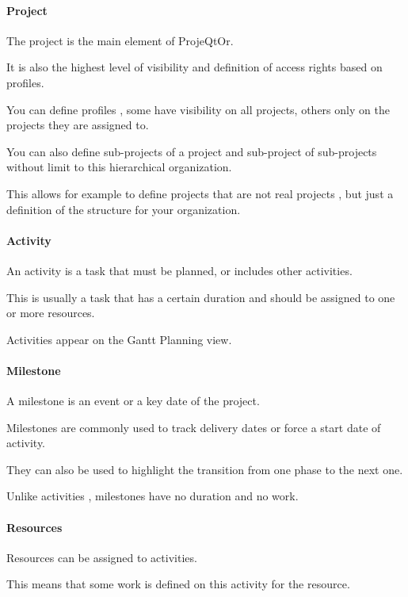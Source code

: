 \documentclass[letterpaper,10pt,english]{sphinxmanual}
\begin{document}
\paragraph{Project}

The project is the main element of ProjeQtOr.

It is also the highest level of visibility and definition of access rights based on profiles.

You can define profiles , some have visibility on all projects, others only on the projects they are assigned to.

You can also define sub-projects of a project and sub-project of sub-projects without limit to this hierarchical organization.

This allows for example to define projects that are not real projects , but just a definition of the structure for your organization.

\paragraph{Activity}

An activity is a task that must be planned, or includes other activities.

This is usually a task that has a certain duration and should be assigned to one or more resources.

Activities appear on the Gantt Planning view.

\paragraph{Milestone}

A milestone is an event or a key date of the project.

Milestones are commonly used to track delivery dates or force a start date of activity.

They can also be used to highlight the transition from one phase to the next one.

Unlike activities , milestones have no duration and no work.

\paragraph{Resources}

Resources can be assigned to activities.

This means that some work is defined on this activity for the resource.
\end{document}
